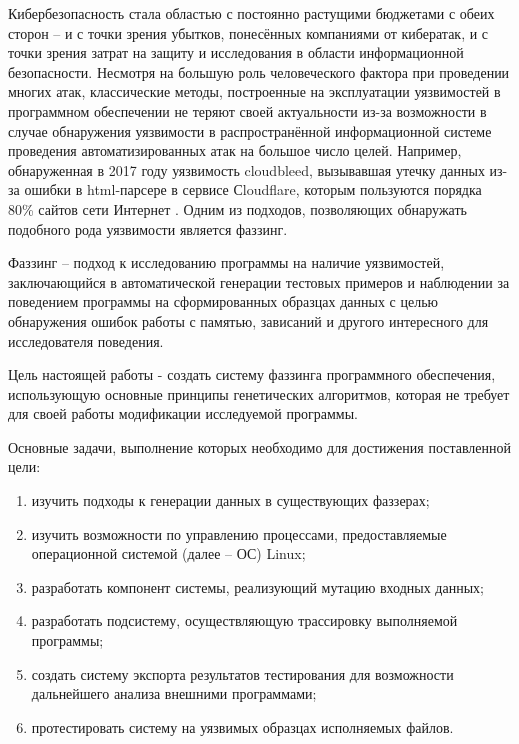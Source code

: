 \label{sec:intro}


Кибербезопасность стала областью с постоянно растущими бюджетами с обеих сторон -- и с точки зрения убытков, понесённых компаниями от кибератак, и с точки зрения затрат на защиту и исследования в области информационной безопасности. Несмотря на большую роль человеческого фактора при проведении многих атак, классические методы, построенные на эксплуатации уязвимостей в программном обеспечении не теряют своей актуальности из-за возможности в случае обнаружения уязвимости в распространённой информационной системе проведения автоматизированных атак на большое число целей. Например, обнаруженная в 2017 году уязвимость cloudbleed, вызывавшая утечку данных из-за ошибки в html-парсере в сервисе Сloudflare, которым пользуются порядка 80\% сайтов сети Интернет \cite{cloudbleed}. Одним из подходов, позволяющих обнаружать подобного рода уязвимости является фаззинг.





Фаззинг -- подход к исследованию программы на наличие уязвимостей, заключающийся в автоматической генерации тестовых примеров и наблюдении за поведением программы на сформированных образцах данных с целью обнаружения ошибок работы с памятью, зависаний и другого интересного для исследователя поведения.

Цель настоящей работы - создать систему фаззинга программного обеспечения, использующую основные принципы генетических алгоритмов, которая не требует для своей работы модификации исследуемой программы.

Основные задачи, выполнение которых необходимо для достижения поставленной цели:

\begin{enumerate}
	\item изучить подходы к генерации данных в существующих фаззерах;
	
	\item изучить возможности по управлению процессами, предоставляемые операционной системой (далее -- ОС) Linux;
	
	\item разработать компонент системы, реализующий мутацию входных данных;
	
	\item разработать подсистему, осуществляющую трассировку выполняемой программы;
	
	\item создать систему экспорта результатов тестирования для возможности дальнейшего анализа внешними программами;
	
	\item протестировать систему на уязвимых образцах исполняемых файлов.
\end{enumerate}
